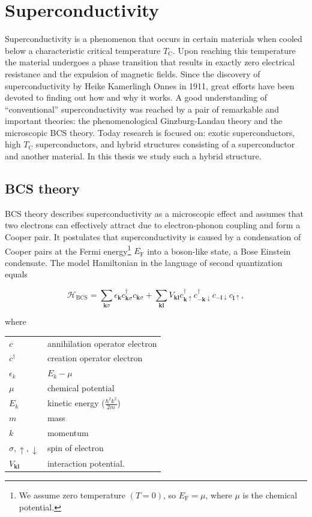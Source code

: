 \section{\label{sec:superconductivity}Superconductivity}

Superconductivity is a phenomenon that occurs in certain materials when cooled below a characteristic critical temperature $T_{\mathrm{C}}$.
Upon reaching this temperature the material undergoes a phase transition that results in exactly zero electrical resistance and the expulsion of magnetic fields.
Since the discovery of superconductivity by Heike Kamerlingh Onnes in 1911, great efforts have been devoted to finding out how and why it works.
A good understanding of ``conventional'' superconductivity was reached by a pair of remarkable and important theories: the phenomenological Ginzburg-Landau theory and the microscopic BCS theory.
Today research is focused on: exotic superconductors, high $T_{\mathrm{C}}$ superconductors, and hybrid structures consisting of a superconductor and another material.
In this thesis we study such a hybrid structure.

\subsection{BCS theory\label{sec:BCS-theory}}

BCS theory describes superconductivity as a microscopic effect and assumes that two electrons can effectively attract due to electron-phonon coupling and form a Cooper pair.
It postulates that superconductivity is caused by a condensation of Cooper pairs at the Fermi energy\footnote{We assume zero temperature $\left(T=0\right)$, so $E_{\textrm{F}}=\mu$, where $\mu$ is the chemical potential.} $E_{\textrm{F}}$ into a boson-like state, a Bose Einstein condensate.
The model Hamiltonian in the language of second quantization equals~\cite{Gennes1999}

\begin{equation}
\mathcal{H}_{\textrm{BCS}}=\sum_{\bm{k}\sigma}\epsilon_{\bm{k}}c_{\bm{k}\sigma}^{\dagger}c_{\bm{k}\sigma}+\sum_{\bm{k}\bm{l}}V_{\bm{k}\bm{l}}c_{\bm{k}\uparrow}^{\dagger}c_{-\bm{k}\downarrow}^{\dagger}c_{-\bm{l}\downarrow}c_{\bm{l}\uparrow},\label{eq:BCS}
\end{equation}

where

\begin{tabular}{ll}
 $c$  & annihilation operator electron \tabularnewline
 $c^{\dagger}$ & creation operator electron\tabularnewline
 $\epsilon_{k}$  &  $E_{k}-\mu$\tabularnewline
$\mu$ & chemical potential\tabularnewline
$E_{k}$ & kinetic energy ($\frac{\hbar^{2}k^{2}}{2m}$)\tabularnewline
$m$ & mass\tabularnewline
 $k$  & momentum\tabularnewline
 $\sigma,\uparrow,\downarrow$  & spin of electron\tabularnewline
 $V_{\bm{kl}}$ & interaction potential.\tabularnewline
\end{tabular}



